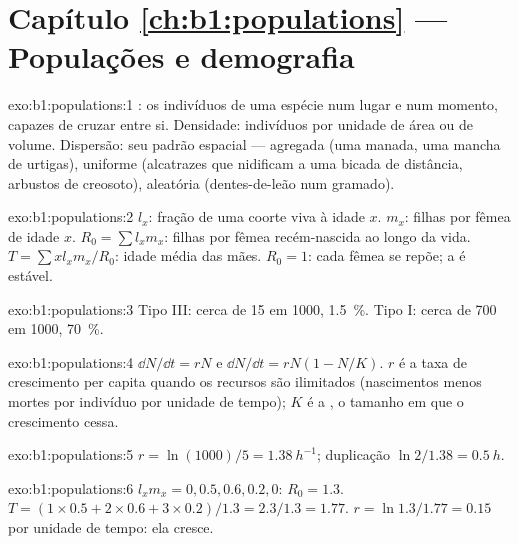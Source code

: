 \section*{Capítulo \ref{ch:b1:populations} --- Populações e demografia}

\begin{solution}{exo:b1:populations:1}
: os indivíduos de uma espécie num lugar e num momento,
capazes de cruzar entre si. Densidade: indivíduos por unidade de área
ou de volume. Dispersão: seu padrão espacial --- agregada (uma manada,
uma mancha de urtigas), uniforme (alcatrazes que nidificam a uma
bicada de distância, arbustos de creosoto), aleatória
(dentes-de-leão num gramado).
\end{solution}

\begin{solution}{exo:b1:populations:2}
$l_x$: fração de uma coorte viva à idade $x$. $m_x$: filhas por fêmea
de idade $x$. $R_0 = \sum l_x m_x$: filhas por fêmea recém-nascida ao
longo da vida. $T = \sum x l_x m_x / R_0$: idade média das mães.
$R_0 = 1$: cada fêmea se repõe; a  é estável.
\end{solution}

\begin{solution}{exo:b1:populations:3}
Tipo III: cerca de 15 em 1000, \qty{1.5}{\%}. Tipo I: cerca de 700 em
1000, \qty{70}{\%}.
\end{solution}

\begin{solution}{exo:b1:populations:4}
$\dd N/\dd t = rN$ e $\dd N/\dd t = rN(1 - N/K)$. $r$ é a taxa de
crescimento per capita quando os recursos são ilimitados (nascimentos
menos mortes por indivíduo por unidade de tempo); $K$ é a , o tamanho em que o crescimento cessa.
\end{solution}

\begin{solution}{exo:b1:populations:5}
$r = \ln(1000)/5 = \qty{1.38}{h^{-1}}$; duplicação $\ln 2/1.38 =
\qty{0.5}{h}$.
\end{solution}

\begin{solution}{exo:b1:populations:6}
$l_x m_x = 0, 0.5, 0.6, 0.2, 0$: $R_0 = 1.3$. $T = (1\times 0.5 +
2\times 0.6 + 3\times 0.2)/1.3 = 2.3/1.3 = 1.77$. $r = \ln 1.3/1.77 =
\qty{0.15}{}$ por unidade de tempo: ela cresce.
\end{solution}

